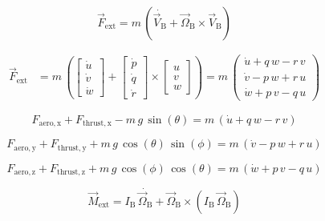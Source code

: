 \documentclass{article}
\begin{document}
\begin{dmath}
\overrightarrow{F}_{\mathrm{ext}}=m\,\left(\dot{\overrightarrow{V}_{\mathrm{B}}} + \overrightarrow{\Omega}_{\mathrm{B}} \times \overrightarrow{V}_{\mathrm{B}} \right)
\end{dmath}

\begin{dmath}
\begin{aligned}
\overrightarrow{F}_{\mathrm{ext}}&=m\,\left( \left[\begin{array}{c} \dot{u}\\ \dot{v}\\ \dot{w} \end{array}\right] + \left[\begin{array}{c} \dot{p}\\ \dot{q}\\ \dot{r} \end{array}\right] \times \left[\begin{array}{c} u\\ v\\ w \end{array}\right] \right) = m\,\left(\begin{array}{c} \dot{u}+q\,w-r\,v\\ \dot{v}-p\,w+r\,u\\ \dot{w}+p\,v-q\,u \end{array}\right)
\end{aligned}
\end{dmath}

\begin{dmath}
F_{\mathrm{aero,x}}+F_{\mathrm{thrust,x}}-m\,g\,\sin\left(\theta \right)=m\,\left(\dot{u}+q\,w-r\,v\right)
\end{dmath}

\begin{dmath}
F_{\mathrm{aero,y}}+F_{\mathrm{thrust,y}}+m\,g\,\cos\left(\theta \right)\,\sin\left(\phi \right)=m\,\left(\dot{v}-p\,w+r\,u\right)
\end{dmath}

\begin{dmath}
F_{\mathrm{aero,z}}+F_{\mathrm{thrust,z}}+m\,g\,\cos\left(\phi \right)\,\cos\left(\theta \right)=m\,\left(\dot{w}+p\,v-q\,u\right)
\end{dmath}

\begin{dmath}
\overrightarrow{M}_{\mathrm{ext}}=I_{\mathrm{B}}\,\dot{\overrightarrow{\Omega}_{\mathrm{B}}} + \overrightarrow{\Omega}_{\mathrm{B}} \times \left(I_{\mathrm{B}}\,\overrightarrow{\Omega}_{\mathrm{B}}\right)
\end{dmath}
\end{document}
